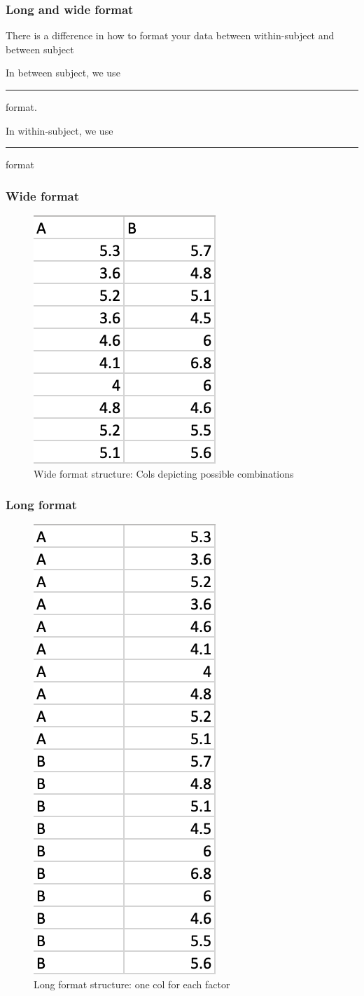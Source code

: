 \documentclass{beamer}
\begin{document}
\begin{frame}
	\frametitle{Long and wide format}
	There is a difference in how to format your data between within-subject and between subject
	
	\medskip
	In between subject, we use \rule{1cm}{0.15mm} format.
	
	\medskip
	In within-subject, we use \rule{1cm}{0.15mm} format
\end{frame}

\begin{frame}
	\frametitle{Wide format}
	\begin{figure}
		\includegraphics[width=0.2\linewidth]{wide-format}
		\caption{Wide format structure:  Cols depicting possible combinations}
	\end{figure}
\end{frame}

\begin{frame}
	\frametitle{Long format}
	\begin{figure}
		\includegraphics[width=0.2\linewidth]{long-format}
		\caption{Long format structure:  one col for each factor}
	\end{figure}
\end{frame}
\end{document}
